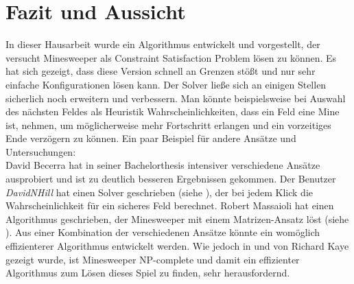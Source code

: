 %
\graphicspath{{chapters/images/}}
\section{Fazit und Aussicht}

In dieser Hausarbeit wurde ein Algorithmus entwickelt und vorgestellt, der versucht Minesweeper als Constraint Satisfaction Problem lösen
zu können. Es hat sich gezeigt, dass diese Version schnell an Grenzen stößt und nur sehr einfache Konfigurationen lösen kann. Der Solver
ließe sich an einigen Stellen sicherlich noch erweitern und verbessern. Man könnte beispielsweise bei Auswahl des nächsten Feldes als 
Heuristik Wahrscheinlichkeiten, dass ein Feld eine Mine ist, nehmen, um möglicherweise mehr Fortschritt erlangen und ein vorzeitiges
Ende verzögern zu können. Ein paar Beispiel für andere Ansätze und Untersuchungen:\\
David Becerra hat in seiner Bachelorthesis \cite{AlgoApproaches} intensiver verschiedene Ansätze ausprobiert und
ist zu deutlich besseren Ergebnissen gekommen. Der Benutzer \textit{DavidNHill} hat einen Solver geschrieben (siehe \cite{statistics}), der
bei jedem Klick die Wahrscheinlichkeit für ein sicheres Feld berechnet. Robert Massaioli hat einen Algorithmus geschrieben, der Minesweeper
mit einem Matrizen-Ansatz löst (siehe \cite{matrix}). Aus einer Kombination der verschiedenen Ansätze könnte ein womöglich
effizienterer Algorithmus entwickelt werden.
Wie jedoch in \cite{MS-NP} und \cite{MS-Conf} von Richard Kaye gezeigt wurde, ist Minesweeper NP-complete und damit
ein effizienter Algorithmus zum Lösen dieses Spiel zu finden, sehr herausfordernd.
